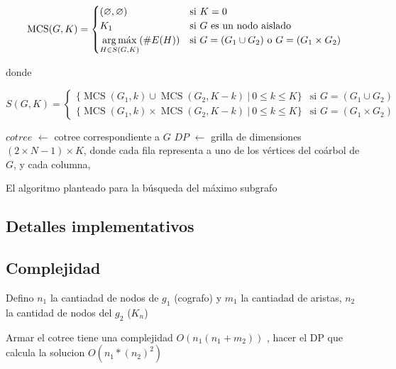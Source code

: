 \[
    \operatorname{MCS}(G, K) = \begin{cases}
        (\varnothing, \varnothing) & \text{si } K = 0 \\
        K_1 & \text{si } G \text{ es un nodo aislado} \\
        \displaystyle \argmax_{H \in S(G, K)}(\#E(H)) & \text{si } G = (G_1
        \cup G_2) \text{ o } G = (G_1 \times G_2) \\
    \end{cases}
\]

donde

\[
    S(G, K) = \begin{cases}
        \lbrace \operatorname{MCS}(G_1, k) \cup \operatorname{MCS}(G_2, K -
        k) \ \vert\ 0 \leq k \leq K \rbrace & \text{si } G = (G_1 \cup G_2) \\
        \lbrace \operatorname{MCS}(G_1, k) \times \operatorname{MCS}(G_2, K -
        k) \ \vert\ 0 \leq k \leq K \rbrace & \text{si } G = (G_1 \times G_2)
    \end{cases}
\]

\begin{algorithm}[H]

    $cotree$ $\gets$ cotree correspondiente a $G$ \;
    $DP$ $\gets$ grilla de dimensiones $(2 \times N - 1) \times K$, donde \;
    cada fila representa a uno de los vértices del coárbol de $G$, y cada \;
    columna,
\end{algorithm}


El algoritmo planteado para la búsqueda del máximo subgrafo


\subsection{Detalles implementativos}

\subsection{Complejidad}
Defino $n_1$ la cantiadad de nodos de $g_1$ (cografo) y $m_1$ la cantiadad de aristas, 
$n_2$ la cantidad de nodos del $g_2$ ($K_n$) 

Armar el cotree tiene una complejidad $O(n_1(n_1 + m_2))$ , hacer el DP que calcula la solucion $O(n_1 * (n_2)^2 )$

